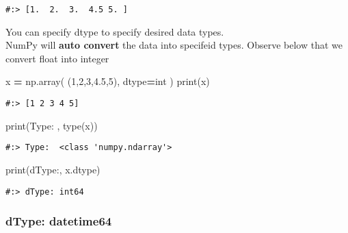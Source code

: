 \documentclass[
]{book}
\newenvironment{Shaded}{\begin{snugshade}}{\end{snugshade}}
\newcommand{\BuiltInTok}[1]{#1}
\newcommand{\DecValTok}[1]{\textcolor[rgb]{0.06,0.06,0.06}{#1}}
\newcommand{\FloatTok}[1]{\textcolor[rgb]{0.06,0.06,0.06}{#1}}
\newcommand{\NormalTok}[1]{#1}
\newcommand{\OperatorTok}[1]{\textcolor[rgb]{0.43,0.43,0.43}{\textbf{#1}}}
\newcommand{\StringTok}[1]{\textcolor[rgb]{0.5,0.5,0.5}{#1}}
\begin{document}
\begin{verbatim}
#:> [1.  2.  3.  4.5 5. ]
\end{verbatim}

You can specify dtype to specify desired data types.\\
NumPy will \textbf{auto convert} the data into specifeid types. Observe below that we convert float into integer

\begin{Shaded}
\begin{Highlighting}[]
\NormalTok{x }\OperatorTok{=}\NormalTok{ np.array( (}\DecValTok{1}\NormalTok{,}\DecValTok{2}\NormalTok{,}\DecValTok{3}\NormalTok{,}\FloatTok{4.5}\NormalTok{,}\DecValTok{5}\NormalTok{), dtype}\OperatorTok{=}\StringTok{\textquotesingle{}int\textquotesingle{}}\NormalTok{ )}
\BuiltInTok{print}\NormalTok{(x)}
\end{Highlighting}
\end{Shaded}

\begin{verbatim}
#:> [1 2 3 4 5]
\end{verbatim}

\begin{Shaded}
\begin{Highlighting}[]
\BuiltInTok{print}\NormalTok{(}\StringTok{\textquotesingle{}Type: \textquotesingle{}}\NormalTok{, }\BuiltInTok{type}\NormalTok{(x))}
\end{Highlighting}
\end{Shaded}

\begin{verbatim}
#:> Type:  <class 'numpy.ndarray'>
\end{verbatim}

\begin{Shaded}
\begin{Highlighting}[]
\BuiltInTok{print}\NormalTok{(}\StringTok{\textquotesingle{}dType:\textquotesingle{}}\NormalTok{, x.dtype)}
\end{Highlighting}
\end{Shaded}

\begin{verbatim}
#:> dType: int64
\end{verbatim}

\hypertarget{dtype-datetime64}{%
\subsubsection{dType: datetime64}\label{dtype-datetime64}}
\end{document}
